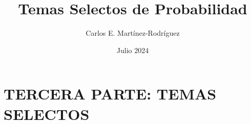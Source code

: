 \documentclass{report}
\title{Temas Selectos de Probabilidad}
\author{Carlos E. Martínez-Rodríguez}
\date{Julio 2024}
\begin{document}
\maketitle

\tableofcontents

\part{TERCERA PARTE: TEMAS SELECTOS}

%
%
%
%
%
%
%

%
%
%
%
\end{document}
